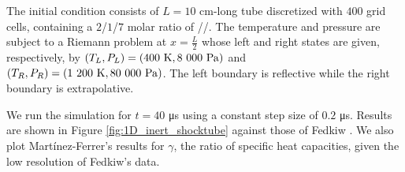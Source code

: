 The initial condition consists of $L=10$ \si{\centi\meter}-long tube discretized
with $400$ grid cells, containing a $2$/$1$/$7$ molar ratio of //.
The temperature and pressure are subject to a Riemann problem at $x=\frac{L}{2}$
whose left and right states are given, respectively, by
$\left(T_L,P_L\right) = (400\text{ \si{\kelvin}}, 8\text{ }000\text{ \si{\pascal}})$
and $\left(T_R,P_R\right) = (1\text{ }200\text{ \si{\kelvin}}, 80\text{ }000\text{ \si{\pascal}})$.
The left boundary is reflective while the right boundary is extrapolative.

We run the simulation for $t=40$ \si{\micro\second} using a constant step size of
$0.2$ \si{\micro\second}. Results are shown in Figure \ref{fig:1D_inert_shocktube}
against those of Fedkiw \cite{FedkiwPHD}. We also plot Martínez-Ferrer's
results for $\gamma$, the ratio of specific heat capacities, given the low resolution
of Fedkiw's data.

